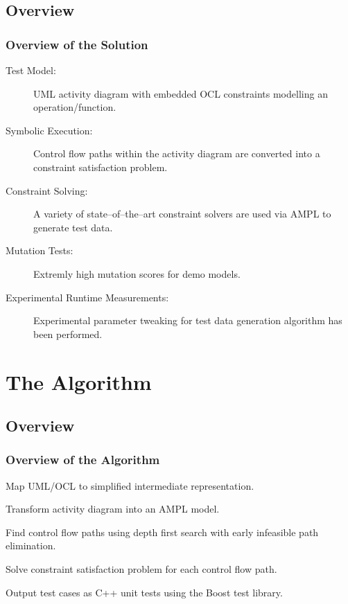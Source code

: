 \documentclass{beamer}
\begin{document}
\subsection{Overview}
\begin{frame}
\frametitle{Overview of the Solution}
\begin{description}
\item[Test Model:] UML activity diagram with embedded OCL constraints modelling an operation/function.
\item[Symbolic Execution:] Control flow paths within the activity diagram are converted into a constraint satisfaction problem.
\item[Constraint Solving:] A variety of state--of--the--art constraint solvers are used via AMPL to generate test data.
\end{description}
\begin{description}
\item[Mutation Tests:] Extremly high mutation scores for demo models.
\item[Experimental Runtime Measurements:] Experimental parameter tweaking for test data generation algorithm has been performed.
\end{description}
\end{frame}


\section{The Algorithm}
\subsection{Overview}
\begin{frame}
\frametitle{Overview of the Algorithm}
\begin{block}{}
Map UML/OCL to simplified intermediate representation.
\end{block}
\begin{block}{}
Transform activity diagram into an AMPL model.
\end{block}
\begin{block}{}
Find control flow paths using depth first search with early infeasible path elimination.
\end{block}
\begin{block}{}
Solve constraint satisfaction problem for each control flow path.
\end{block}
\begin{block}{}
Output test cases as C++ unit tests using the Boost test library.
\end{block}
\end{frame}
\end{document}
